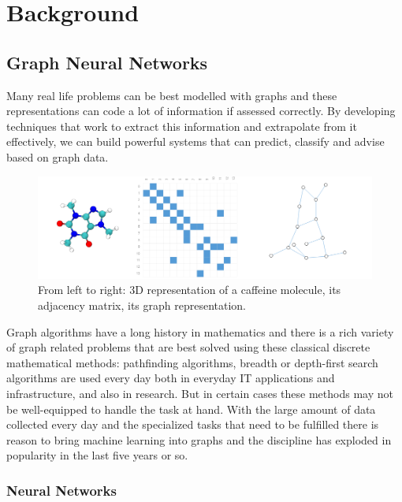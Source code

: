 \chapter{Background}

\section{Graph Neural Networks}

	Many real life problems can be best modelled with graphs and these representations can code a lot of information if assessed correctly. By developing techniques that work to extract this information and extrapolate from it effectively, we can build powerful systems that can predict, classify and advise based on graph data.
	
	\begin{figure}[!h]
		\centering
		\includegraphics[width=\textwidth]{figures/molecule.png}
		\caption{From left to right: 3D representation of a caffeine molecule, its adjacency matrix, its graph representation. \cite{sanchez-lengeling2021a}}
	\end{figure}
	
	Graph algorithms have a long history in mathematics and there is a rich variety of graph related problems that are best solved using these classical discrete mathematical methods: pathfinding algorithms, breadth or depth-first search algorithms are used every day both in everyday IT applications and infrastructure, and also in research. But in certain cases these methods may not be well-equipped to handle the task at hand. With the large amount of data collected every day and the specialized tasks that need to be fulfilled there is reason to bring machine learning into graphs and the discipline has exploded in popularity in the last five years or so.

	\subsection{Neural Networks}
	
